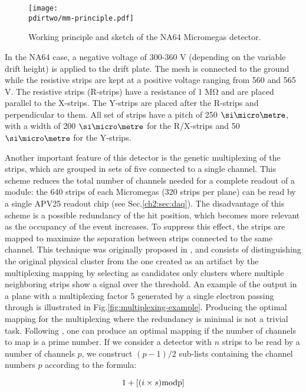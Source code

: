 \begin{figure}[bth!]
  \centering
  \texttt{[image: \\pdirtwo/mm-principle.pdf]}
\caption[Micromegas sketch]{Working principle and sketch of the NA64 Micromegas detector.}
\label{fig:mm-sketch}
\end{figure}

In the NA64 case, a negative voltage of 300-360 \si{\volt} (depending on the variable drift height) is applied to the drift plate. The mesh is connected to the ground while the resistive strips are kept at a positive voltage ranging from 560 and 565 \si{\volt}. The resistive strips (R-strips) have a resistance of 1 \si{\mega\ohm} and are placed parallel to the X-strips. The Y-strips are placed after the R-strips and perpendicular to them. All set of strips have a pitch of 250 $\mum$, with a width of 200 $\mum$ for the R/X-strips and 50 $\mum$ for the Y-strips.

Another important feature of this detector is the genetic multiplexing of the strips, which are grouped in sets of five connected to a single channel. This scheme reduces the total number of channels needed for a complete readout of a module: the 640 strips of each Micromegas (320 strips per plane) can be read by a single APV25 readout chip (see Sec.\ref{ch2:sec:daq}). The disadvantage of this scheme is a possible redundancy of the hit position, which becomes more relevant as the occupancy of the event increases. To suppress this effect, the strips are mapped to maximize the separation between strips connected to the same channel. This technique was originally proposed in \cite{Procureur:2013yea}, and consists of distinguishing the original physical cluster from the one created as an artifact by the multiplexing mapping by selecting as candidates only clusters where multiple neighboring strips show a signal over the threshold. An example of the output in a plane with a multiplexing factor 5 generated by a single electron passing through is illustrated in Fig.\ref{fig:multiplexing-example}. Producing the optimal mapping for the multiplexing where the redundancy is minimal is not a trivial task. Following \cite{Procureur:2013yea}, one can produce an optimal mapping if the number of channels to map is a prime number. If we consider a detector with $n$ strips to be read by a number of channels $p$, we construct $(p-1)/2$ sub-lists containing the channel numbers $p$ according to the formula:

\begin{equation}
\label{eq:mm-multiplexing-mapping}
1 + [(i \times s) \rm{mod} p]
\end{equation}

